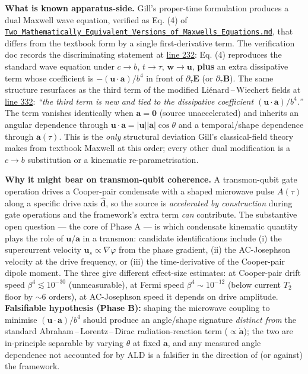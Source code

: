 \documentclass[
  11pt,
]{article}
\begin{document}
\textbf{What is known apparatus-side.} Gill's proper-time formulation
produces a dual Maxwell wave equation, verified as Eq. (4) of
\href{../Equation_Verification/Two_Mathematically_Equivalent_Versions_of_Maxwells_Equations.md\#L188}{\texttt{Two\_Mathematically\_Equivalent\_Versions\_of\_Maxwells\_Equations.md}},
that differs from the textbook form by a single first-derivative term.
The verification doc records the discriminating statement at
\href{../Equation_Verification/Two_Mathematically_Equivalent_Versions_of_Maxwells_Equations.md\#L232}{line
232}: Eq. (4) reproduces the standard wave equation under \(c\to b\),
\(t\to\tau\), \(\mathbf{w}\to\mathbf{u}\), \textbf{plus} an extra
dissipative term whose coefficient is
\(-(\mathbf{u}\!\cdot\!\mathbf{a})/b^4\) in front of
\(\partial_\tau\mathbf{E}\) (or \(\partial_\tau\mathbf{B}\)). The same
structure resurfaces as the third term of the modified
Liénard\(\,\)--\(\,\)Wiechert fields at
\href{../Equation_Verification/Two_Mathematically_Equivalent_Versions_of_Maxwells_Equations.md\#L332}{line
332}: \emph{``the third term is new and tied to the dissipative
coefficient \((\mathbf{u}\!\cdot\!\mathbf{a})/b^4\).''} The term
vanishes identically when \(\mathbf{a}=\mathbf{0}\) (source
unaccelerated) and inherits an angular dependence through
\(\mathbf{u}\!\cdot\!\mathbf{a}=|\mathbf{u}||\mathbf{a}|\cos\theta\) and
a temporal/shape dependence through \(\mathbf{a}(\tau)\). This is the
\emph{only} structural deviation Gill's classical-field theory makes
from textbook Maxwell at this order; every other dual modification is a
\(c\to b\) substitution or a kinematic re-parametrisation.

\textbf{Why it might bear on transmon-qubit coherence.} A transmon-qubit
gate operation drives a Cooper-pair condensate with a shaped microwave
pulse \(A(\tau)\) along a specific drive axis \(\hat{\mathbf{d}}\), so
the source is \emph{accelerated by construction} during gate operations
and the framework's extra term \emph{can} contribute. The substantive
open question --- the core of Phase A --- is which condensate kinematic
quantity plays the role of \(\mathbf{u}\)/\(\mathbf{a}\) in a transmon:
candidate identifications include (i) the supercurrent velocity
\(\mathbf{u}_s\propto\nabla\varphi\) from the phase gradient, (ii) the
AC-Josephson velocity at the drive frequency, or (iii) the
time-derivative of the Cooper-pair dipole moment. The three give
different effect-size estimates: at Cooper-pair drift speed
\(\beta^4 \lesssim 10^{-30}\) (unmeasurable), at Fermi speed
\(\beta^4 \sim 10^{-12}\) (below current \(T_2\) floor by \(\sim 6\)
orders), at AC-Josephson speed it depends on drive amplitude.
\textbf{Falsifiable hypothesis (Phase B):} shaping the microwave
coupling to minimise \((\mathbf{u}\!\cdot\!\mathbf{a})/b^4\) should
produce an angle/shape signature \emph{distinct from} the standard
Abraham\(\,\)--\(\,\)Lorentz\(\,\)--\(\,\)Dirac radiation-reaction term
(\(\propto\dot{\mathbf{a}}\)); the two are in-principle separable by
varying \(\theta\) at fixed \(\dot{\mathbf{a}}\), and any measured angle
dependence not accounted for by ALD is a falsifier in the direction of
(or against) the framework.
\end{document}
